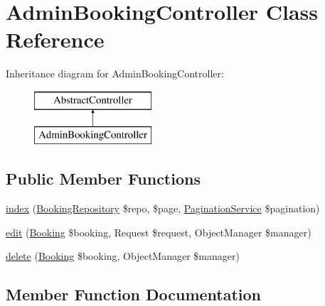 \hypertarget{class_app_1_1_controller_1_1_admin_booking_controller}{}\section{Admin\+Booking\+Controller Class Reference}
\label{class_app_1_1_controller_1_1_admin_booking_controller}
Inheritance diagram for Admin\+Booking\+Controller\+:\begin{figure}[H]
\begin{center}
\leavevmode
\includegraphics[height=2.000000cm]{class_app_1_1_controller_1_1_admin_booking_controller}
\end{center}
\end{figure}
\subsection*{Public Member Functions}
\begin{DoxyCompactItemize}
\item 
\mbox{\hyperlink{class_app_1_1_controller_1_1_admin_booking_controller_a1616199d1904278a6c2daaf622b766a9}{index}} (\mbox{\hyperlink{class_app_1_1_repository_1_1_booking_repository}{Booking\+Repository}} \$repo, \$page, \mbox{\hyperlink{class_app_1_1_service_1_1_pagination_service}{Pagination\+Service}} \$pagination)
\item 
\mbox{\hyperlink{class_app_1_1_controller_1_1_admin_booking_controller_abab509bdef8d07f6d4e9678b7bdc7aa5}{edit}} (\mbox{\hyperlink{class_app_1_1_entity_1_1_booking}{Booking}} \$booking, Request \$request, Object\+Manager \$manager)
\item 
\mbox{\hyperlink{class_app_1_1_controller_1_1_admin_booking_controller_a2a52fb92d16ac69d8c6848177a7a314a}{delete}} (\mbox{\hyperlink{class_app_1_1_entity_1_1_booking}{Booking}} \$booking, Object\+Manager \$manager)
\end{DoxyCompactItemize}


\subsection{Member Function Documentation}
\mbox{\label{class_app_1_1_controller_1_1_admin_booking_controller_a2a52fb92d16ac69d8c6848177a7a314a}} 
